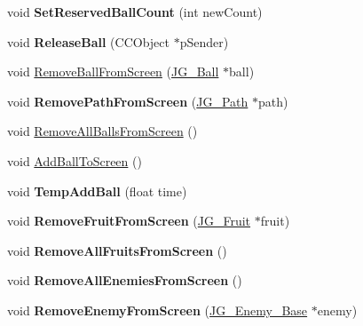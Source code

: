 \begin{DoxyCompactItemize}
\item 
\hypertarget{class_j_g___game___main_a104268d29cacf4bca7912a19fe2cdfd9}{void {\bfseries Set\-Reserved\-Ball\-Count} (int new\-Count)}\label{class_j_g___game___main_a104268d29cacf4bca7912a19fe2cdfd9}

\item 
\hypertarget{class_j_g___game___main_a2fe9989aefd12882a50e535b04c554fb}{void {\bfseries Release\-Ball} (C\-C\-Object $\ast$p\-Sender)}\label{class_j_g___game___main_a2fe9989aefd12882a50e535b04c554fb}

\item 
void \hyperlink{class_j_g___game___main_adc1658ea07b4deb55bfe22df04b61aa2}{Remove\-Ball\-From\-Screen} (\hyperlink{class_j_g___ball}{J\-G\-\_\-\-Ball} $\ast$ball)
\item 
\hypertarget{class_j_g___game___main_a0c8d265a7daffcd21337deda74c233f3}{void {\bfseries Remove\-Path\-From\-Screen} (\hyperlink{class_j_g___path}{J\-G\-\_\-\-Path} $\ast$path)}\label{class_j_g___game___main_a0c8d265a7daffcd21337deda74c233f3}

\item 
void \hyperlink{class_j_g___game___main_a3b5871764fe94896c274e2a072c00dda}{Remove\-All\-Balls\-From\-Screen} ()
\item 
void \hyperlink{class_j_g___game___main_ae827327aa2c6e58cee824a6f5010f5fe}{Add\-Ball\-To\-Screen} ()
\item 
\hypertarget{class_j_g___game___main_abbbc10c904cdcba09260c925c36d0f22}{void {\bfseries Temp\-Add\-Ball} (float time)}\label{class_j_g___game___main_abbbc10c904cdcba09260c925c36d0f22}

\item 
\hypertarget{class_j_g___game___main_aebbaadf23d5bdeed3b34b59d8b4a4fd2}{void {\bfseries Remove\-Fruit\-From\-Screen} (\hyperlink{class_j_g___fruit}{J\-G\-\_\-\-Fruit} $\ast$fruit)}\label{class_j_g___game___main_aebbaadf23d5bdeed3b34b59d8b4a4fd2}

\item 
\hypertarget{class_j_g___game___main_a34558ac00d2f694351f4a4008fc542db}{void {\bfseries Remove\-All\-Fruits\-From\-Screen} ()}\label{class_j_g___game___main_a34558ac00d2f694351f4a4008fc542db}

\item 
\hypertarget{class_j_g___game___main_ad1ab733cda6f1462d6fd788eef5fc1a4}{void {\bfseries Remove\-All\-Enemies\-From\-Screen} ()}\label{class_j_g___game___main_ad1ab733cda6f1462d6fd788eef5fc1a4}

\item 
\hypertarget{class_j_g___game___main_a6a7675634a2549d82cd45791580b9be9}{void {\bfseries Remove\-Enemy\-From\-Screen} (\hyperlink{class_j_g___enemy___base}{J\-G\-\_\-\-Enemy\-\_\-\-Base} $\ast$enemy)}\label{class_j_g___game___main_a6a7675634a2549d82cd45791580b9be9}


\end{DoxyCompactItemize}
